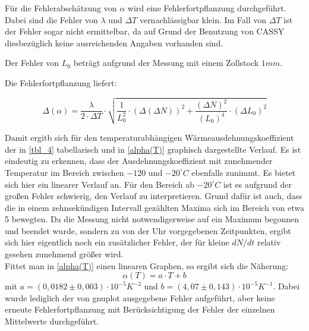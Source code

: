 Für die Fehlerabschätzung von $ \alpha $ wird eine Fehlerfortpflanzung durchgeführt.
Dabei sind die Fehler von $ \lambda $  und  $ \Delta T $ vernachlässigbar klein. Im Fall von $ \Delta T $ ist der Fehler sogar nicht ermittelbar, da auf Grund der Benutzung von CASSY diesbezüglich keine ausreichenden Angaben vorhanden sind.

Der Fehler von $ L_{0} $ beträgt aufgrund der Messung mit einem Zollstock $ 1 mm $.

Die Fehlerfortpflanzung liefert:

\begin{equation}
\Delta (\alpha) = \frac{\lambda}{2 \cdot \Delta T} \cdot \sqrt{\frac{1}{L_{0}^{2}} \cdot (\Delta(\Delta N))^{2} + \frac{(\Delta N)^{2}}{(L_{0})^{4}} \cdot (\Delta L_{0})^{2}}
\end{equation}


Damit ergitb sich für den temperaturabhängigen Wärmeausdehnungskoeffizient der in \ref{tbl_4} tabellarisch und in \ref{alpha(T)}
graphisch dargestellte Verlauf. Es ist eindeutig zu erkennen, dass der Ausdehnungskoeffizient mit zunehmender Temperatur 
im Bereich zwischen $ -120 $ und $ - 20 ^{\circ} C $ ebenfalls zunimmt. Es bietet sich hier ein linearer Verlauf an.
Für den Bereich ab $ -20 ^{\circ} C $ ist es aufgrund der großen Fehler schwierig, den Verlauf zu interpretieren. Grund 
dafür ist auch, dass die in einem zehnsekündigen Intervall gezählten Maxima sich im Bereich von etwa 5 bewegten. Da die
Messung nicht notwendigerweise auf ein Maximum begonnen und beendet wurde, sondern zu von der Uhr vorgegebenen Zeitpunkten,
ergibt sich hier eigentlich noch ein zusätzlicher Fehler, der für kleine $dN/dt$ relativ gesehen 
zunehmend größer wird. \\
Fittet man in \ref{alpha(T)} einen linearen Graphen, so ergibt sich die Näherung:
\begin{equation}
\alpha(T) = a \cdot T + b 
\end{equation}
mit $ a = (0,0182 \pm 0,003) \cdot 10^{-5} K^{-2} $ und $ b = (4,07 \pm 0,143) \cdot 10^{-5} K^{-1} $. Dabei wurde lediglich
der von gnuplot ausgegebene Fehler aufgeführt, aber keine erneute Fehlerfortpflanzung mit Berücksichtigung der Fehler der einzelnen
Mittelwerte durchgeführt. 

